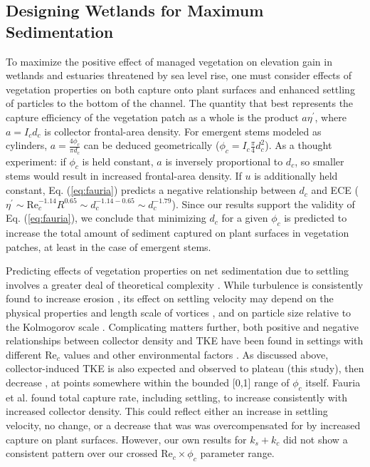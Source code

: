 \documentclass[geosciences,article,submit,moreauthors,pdftex]{Definitions/mdpi}
\newcommand\Rey{\mathrm{Re}}
\begin{document}
\subsection{Designing Wetlands for Maximum Sedimentation}

To maximize the positive effect of managed vegetation on elevation gain in wetlands and estuaries threatened by sea level rise, one must consider effects of vegetation properties on both capture onto plant surfaces and enhanced settling of particles to the bottom of the channel. The quantity that best represents the capture efficiency of the vegetation patch as a whole is the product $a \eta^\prime$, where $a = I_cd_c$ is collector frontal-area density. For emergent stems modeled as cylinders, $a = \frac{4\phi_c}{\pi d_c}$ can be deduced geometrically ($\phi_c = I_c\frac{\pi}{4}d_c^2$). As a thought experiment: if $\phi_c$ is held constant, $a$ is inversely proportional to $d_c$, so smaller stems would result in increased frontal-area density. If $u$ is additionally held constant, Eq. (\ref{eq:fauria}) predicts a negative relationship between $d_c$ and ECE ($\eta^\prime \sim \Rey_c^{-1.14}R^{0.65} \sim d_c^{-1.14 - 0.65} \sim d_c^{-1.79}$). Since our results support the validity of Eq. (\ref{eq:fauria}), we conclude that minimizing $d_c$ for a given $\phi_c$ is predicted to increase the total amount of sediment captured on plant surfaces in vegetation patches, at least in the case of emergent stems.

Predicting effects of vegetation properties on net sedimentation due to settling involves a greater deal of theoretical complexity \cite{dietrich1982,nepf_drag_1999,tanino2008laboratory,mudd2010does,Nielsen_1993,Jacobs_2016,Wang_2018}. While turbulence is consistently found to increase erosion \cite{tinoco2018turbulence, tinoco2016laboratory}, its effect on settling velocity may depend on the physical properties and length scale of vortices \cite{Nielsen_1993}, and on particle size relative to the Kolmogorov scale \cite{Wang_2018, Jacobs_2016}. Complicating matters further, both positive and negative relationships between collector density and TKE have been found in settings with different $\Rey_c$ values and other environmental factors \cite{nepf_drag_1999,tanino2008laboratory,leonard1995flow}. As discussed above, collector-induced TKE is also expected and observed to plateau (this study), then decrease \cite{purich2006capture}, at points somewhere within the bounded [0,1] range of $\phi_c$ itself. Fauria et al. \cite{Fauria_2015} found total capture rate, including settling, to increase consistently with increased collector density. This could reflect either an increase in settling velocity, no change, or a decrease that was was overcompensated for by increased capture on plant surfaces. However, our own results for $k_s + k_c$ did not show a consistent pattern over our crossed $\Rey_c \times \phi_c$ parameter range.
\end{document}
